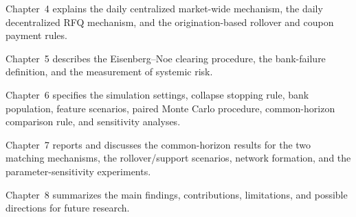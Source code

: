 Chapter~4 explains the daily centralized market-wide mechanism, the daily
decentralized RFQ mechanism, and the origination-based rollover and coupon
payment rules.

Chapter~5 describes the Eisenberg--Noe clearing procedure, the
bank-failure definition, and the measurement of systemic risk.

Chapter~6 specifies the simulation settings, collapse stopping rule,
bank population, feature scenarios, paired Monte Carlo procedure,
common-horizon comparison rule, and sensitivity analyses.

Chapter~7 reports and discusses the common-horizon results for the two
matching mechanisms, the rollover/support scenarios, network formation,
and the parameter-sensitivity experiments.

Chapter~8 summarizes the main findings, contributions, limitations, and
possible directions for future research.
